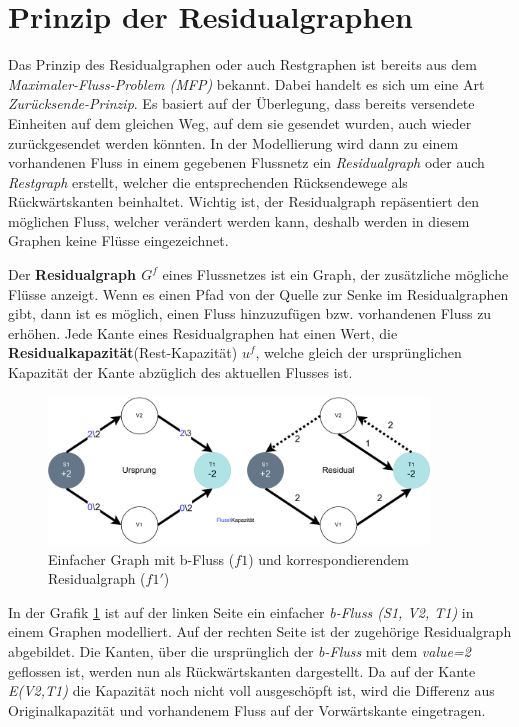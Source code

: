 \section{Prinzip der Residualgraphen}
Das Prinzip des Residualgraphen oder auch Restgraphen ist bereits aus dem \textit{Maximaler-Fluss-Problem (MFP)} bekannt. Dabei handelt es sich um eine Art \textit{Zurücksende-Prinzip}. Es basiert auf der Überlegung, dass bereits versendete Einheiten auf dem gleichen Weg, auf dem sie gesendet wurden, auch wieder zurückgesendet werden könnten. In der Modellierung wird dann zu einem vorhandenen Fluss in einem gegebenen Flussnetz ein \textit{Residualgraph} oder auch \textit{Restgraph} erstellt, welcher die entsprechenden Rücksendewege als Rückwärtskanten beinhaltet. Wichtig ist, der Residualgraph repäsentiert den möglichen Fluss, welcher verändert werden kann, deshalb werden in diesem Graphen keine Flüsse eingezeichnet.
\begin{definition}[Residualgraph]
Der \textbf{Residualgraph $G^f$} eines Flussnetzes ist ein Graph, der zusätzliche mögliche Flüsse anzeigt. Wenn es einen Pfad von der Quelle zur Senke im Residualgraphen gibt, dann ist es möglich, einen Fluss hinzuzufügen bzw. vorhandenen Fluss zu erhöhen. Jede Kante eines Residualgraphen hat einen Wert, die \textbf{Residualkapazität}(Rest-Kapazität)  \textbf{$u^f$}, welche gleich der ursprünglichen Kapazität der Kante abzüglich des aktuellen Flusses ist.
\end{definition}
\begin{figure}[htb]
\centering
\includegraphics[width=0.9\textwidth]{img/steffen/simple_residual.drawio.pdf}
\caption{Einfacher Graph mit b-Fluss ($f1$) und korrespondierendem Residualgraph ($f1'$)}
\label{fig:simple_residual}
\end{figure}
In der Grafik \ref{fig:simple_residual} ist auf der linken Seite ein einfacher \textit{b-Fluss (S1, V2, T1)} in einem Graphen modelliert. Auf der rechten Seite ist der zugehörige Residualgraph abgebildet. Die Kanten, über die ursprünglich der \textit{b-Fluss} mit dem \textit{value=2} geflossen ist, werden nun als Rückwärtskanten dargestellt. Da auf der Kante \textit{E(V2,T1)} die Kapazität noch nicht voll ausgeschöpft ist, wird die Differenz aus Originalkapazität und vorhandenem Fluss auf der Vorwärtskante eingetragen.

